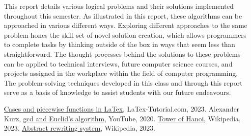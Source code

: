 \documentclass{article}
\theoremstyle{theorem}
\theoremstyle{definition}
\theoremstyle{remark}
\begin{document}
This report details various logical problems and their solutions implemented throughout this semester. As illustrated in this report, these algorithms can be approached in various different ways. Exploring different approaches to the same problem hones the skill set of novel solution creation, which allows programmers to complete tasks by thinking outside of the box in ways that seem less than straightforward. The thought processes behind the solutions to these problems can be applied to technical interviews, future computer science courses, and projects assigned in the workplace within the field of computer programming. The problem-solving techniques developed in this class and through this report serve as a basis of knowledge to assist students with our future endeavours. 

\begin{thebibliography}{99}
 \href{https://latex-tutorial.com/piecewise-functions-latex/}{Cases and piecewise functions in LaTex}, LaTex-Tutorial.com, 2023.
 Alexander Kurz, \href{https://www.youtube.com/watch?v=ZcJMj0antos}{gcd and Euclid's algorithm}, YouTube, 2020.
 \href{https://en.wikipedia.org/wiki/Tower_of_Hanoi}{Tower of Hanoi}, Wikipedia, 2023.
\href{https://en.wikipedia.org/wiki/Abstract_rewriting_system#:~:text=In%20a%20convergent%20ARS%2C%20every,if%20it%20is%20locally%20confluent.}{Abstract rewriting system}, Wikipedia, 2023.
\end{thebibliography}
\end{document}
